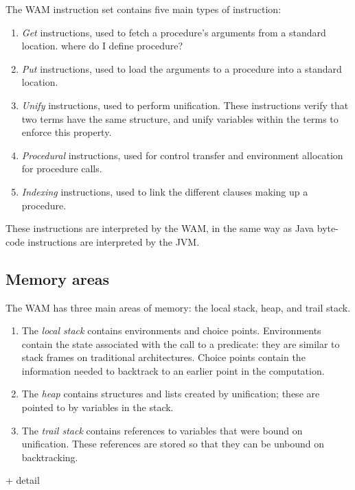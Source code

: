 \documentclass[12pt,a4paper]{report}
\begin{document}
The WAM instruction set contains five main types of instruction:
\begin{enumerate}
\item \emph{Get} instructions, used to fetch a procedure's arguments from a standard location. {\color{red} where do I define procedure?}
\item \emph{Put} instructions, used to load the arguments to a procedure into a standard location. 
\item \emph{Unify} instructions, used to perform unification. These instructions verify that two terms have the same structure, and unify variables within the terms to enforce this property. 
\item \emph{Procedural} instructions, used for control transfer and environment allocation for procedure calls.
\item \emph{Indexing} instructions, used to link the different clauses making up a procedure.
\end{enumerate}
These instructions are interpreted by the WAM, in the same way as Java byte-code instructions are interpreted by the JVM.

\subsection{Memory areas }

The WAM has three main areas of memory: the local stack, heap, and trail stack.
\begin{enumerate}  
\item The  \emph{local stack} contains environments and choice points. Environments contain the state associated with the call to a predicate: they are similar to stack frames on traditional architectures. Choice points contain the information needed to backtrack to an earlier point in the computation.

\item The  \emph{heap} contains structures and lists created by unification; these are pointed to by variables in the stack.

\item The \emph{trail stack} contains references to variables that were bound on unification. These references are stored so that they can be unbound on backtracking. 
\end{enumerate}

{\color{red} + detail}

\end{document}
